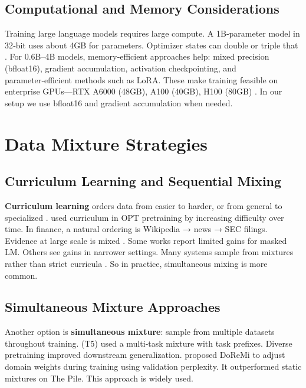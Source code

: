 \subsection{Computational and Memory Considerations}

Training large language models requires large compute. A 1B‑parameter model in 32‑bit uses about 4GB for parameters. Optimizer states can double or triple that \parencite{rajbhandari2020zero,kingma2014adam}. For 0.6B--4B models, memory‑efficient approaches help: mixed precision (bfloat16), gradient accumulation, activation checkpointing, and parameter‑efficient methods such as LoRA. These make training feasible on enterprise GPUs—RTX A6000 (48GB), A100 (40GB), H100 (80GB) \parencite{narayanan2021efficient,hu2021lora}. In our setup we use bfloat16 and gradient accumulation when needed.

\section{Data Mixture Strategies}

\subsection{Curriculum Learning and Sequential Mixing}

\textbf{Curriculum learning} orders data from easier to harder, or from general to specialized \parencite{bengio2009curriculum}. \textcite{wu2022opt} used curriculum in OPT pretraining by increasing difficulty over time. In finance, a natural ordering is Wikipedia → news → SEC filings. Evidence at large scale is mixed \parencite{longpre2023pretrainer}. Some works report limited gains for masked LM. Others see gains in narrower settings. Many systems sample from mixtures rather than strict curricula \parencite{raffel2020exploring,wu2022opt}. So in practice, simultaneous mixing is more common.

\subsection{Simultaneous Mixture Approaches}

Another option is \textbf{simultaneous mixture}: sample from multiple datasets throughout training. \textcite{raffel2020exploring} (T5) used a multi‑task mixture with task prefixes. Diverse pretraining improved downstream generalization. \textcite{xie2023doremi} proposed DoReMi to adjust domain weights during training using validation perplexity. It outperformed static mixtures on The Pile. This approach is widely used.

